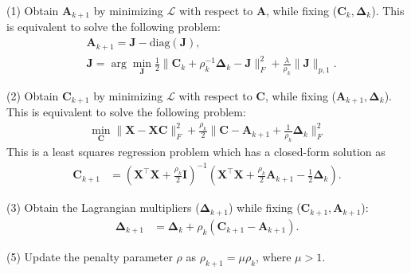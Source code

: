 \documentclass[10pt,twocolumn,letterpaper]{article}
\begin{document}
(1) Obtain $\bm{A}_{k+1}$ by minimizing $\mathcal{L}$ with respect to $\bm{A}$, while fixing ($\bm{C}_{k},\bm{\Delta}_{k}$). This is equivalent to solve the following problem:
\begin{equation}
\begin{split}
\label{e8}
&
\bm{A}_{k+1}
=
\bm{J}-\text{diag}(\bm{J}),
\\
&
\bm{J}
=
\arg\min_{\bm{J}}
\frac{1}{2}
\|
\bm{C}_{k}
+
\rho_{k}^{-1}\bm{\Delta}_{k}
-
\bm{J}
\|_{F}^{2}
+
\frac{\lambda}{\rho_{k}}
\|
\bm{J}
\|_{p,1}.
\end{split}
\end{equation}

(2) Obtain $\bm{C}_{k+1}$ by minimizing $\mathcal{L}$ with respect to $\bm{C}$, while fixing ($\bm{A}_{k+1},\bm{\Delta}_{k}$). This is equivalent to solve the following problem:
\begin{equation}
\begin{split}
\label{e6}
\min_{\bm{C}}
\|
\bm{X}-\bm{X}\bm{C}
\|_{F}^{2}
+
\frac{\rho_{k}}{2}
\|
\bm{C}-\bm{A}_{k+1}+\frac{1}{\rho_{k}}\bm{\Delta}_{k}
\|_{F}^{2}
\end{split}
\end{equation}
This is a least squares regression problem which has a closed-form solution as 
\begin{equation}
\begin{split}
\label{e7}
\bm{C}_{k+1} 
&
=
(\bm{X}^{\top}\bm{X}+\frac{\rho_{k}}{2}\bm{I})^{-1}
(\bm{X}^{\top}\bm{X}+\frac{\rho_{k}}{2}\bm{A}_{k+1}-\frac{1}{2}\bm{\Delta}_{k})
.
\end{split}
\end{equation}

(3) Obtain the Lagrangian multipliers ($\bm{\Delta}_{k+1}$) while fixing ($\bm{C}_{k+1},\bm{A}_{k+1}$):
\begin{equation}
\begin{split}
\label{e10}
\bm{\Delta}_{k+1}
&
=
\bm{\Delta}_{k}
+
\rho_{k}
(\bm{C}_{k+1}-\bm{A}_{k+1})
.
\end{split}
\end{equation}

(5) Update the penalty parameter $\rho$ as $\rho_{k+1}=\mu\rho_{k}$, where $\mu>1$.


{
\small


}
\end{document}
